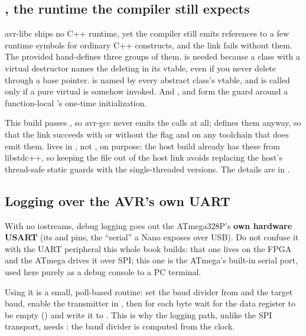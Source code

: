 \subsection{, the runtime the compiler still expects}
\label{c9:sec:env}
avr-libc ships no C++ runtime, yet the compiler still emits references to a few runtime symbols for
ordinary C++ constructs, and the link fails without them. The provided 
hand-defines three groups of them.  is needed because a class with a virtual
destructor names the deleting  in its vtable, even if you never delete through
a base pointer.  is named by every abstract class's vtable, and is called
only if a pure virtual is somehow invoked. And ,
 and  form the guard around a function-local
's one-time initialization.

This build passes , so avr-gcc never emits the 
calls at all;  defines them anyway, so that the link succeeds with or without the flag
and on any toolchain that does emit them.  lives in , not ,
on purpose: the host build already has these from libstdc++, so keeping the file out of the host link
avoids replacing the host's thread-safe static guards with the single-threaded versions. The details
are in .

\subsection{Logging over the AVR's own UART}
\label{c9:sec:logging}
With no iostreams, debug logging goes out the ATmega328P's \textbf{own hardware USART} (its
 and  pins, the ``serial'' a Nano exposes over USB). Do not confuse it with the
UART peripheral this whole book builds: that one lives on the FPGA and the ATmega drives it over
SPI; this one is the ATmega's built-in serial port, used here purely as a debug console to a PC
terminal.

Using it is a small, poll-based routine: set the baud divider  from  and the
target baud, enable the transmitter in , then for each byte wait for the data register
to be empty () and write it to . This is why the logging
path, unlike the SPI transport, needs : the baud divider is computed from the clock.

